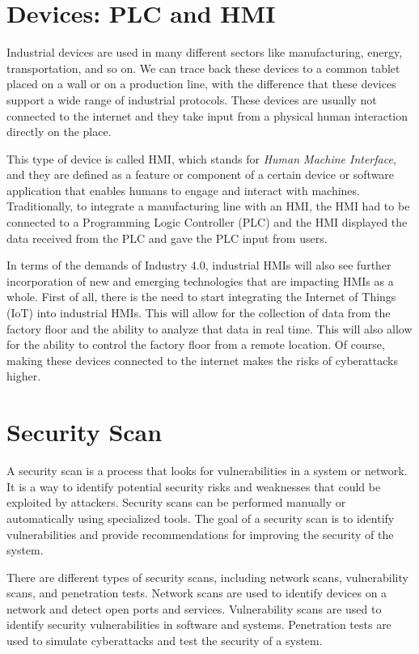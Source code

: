 \section{Devices: PLC and HMI}

Industrial devices are used in many different sectors like manufacturing, energy, transportation, and so on. We can trace back these devices to a common tablet placed on a wall or on a production line, with the difference that these devices support a wide range of industrial protocols. These devices are usually not connected to the internet and they take input from a physical human interaction directly on the place.

This type of device is called HMI, which stands for \textit{Human Machine Interface}, and they are defined as a feature or component of a certain device or software application that enables humans to engage and interact with machines.\\
Traditionally, to integrate a manufacturing line with an HMI, the HMI had to be connected to a Programming Logic Controller (PLC) and the HMI displayed the data received from the PLC and gave the PLC input from users.~\cite{what-is-hmi}

In terms of the demands of Industry 4.0, industrial HMIs will also see further incorporation of new and emerging technologies that are impacting HMIs as a whole. First of all, there is the need to start integrating the Internet of Things (IoT) into industrial HMIs. This will allow for the collection of data from the factory floor and the ability to analyze that data in real time. This will also allow for the ability to control the factory floor from a remote location. Of course, making these devices connected to the internet makes the risks of cyberattacks higher.

\section{Security Scan}

A security scan is a process that looks for vulnerabilities in a system or network. It is a way to identify potential security risks and weaknesses that could be exploited by attackers. Security scans can be performed manually or automatically using specialized tools. The goal of a security scan is to identify vulnerabilities and provide recommendations for improving the security of the system.

There are different types of security scans, including network scans, vulnerability scans, and penetration tests. Network scans are used to identify devices on a network and detect open ports and services. Vulnerability scans are used to identify security vulnerabilities in software and systems. Penetration tests are used to simulate cyberattacks and test the security of a system.

